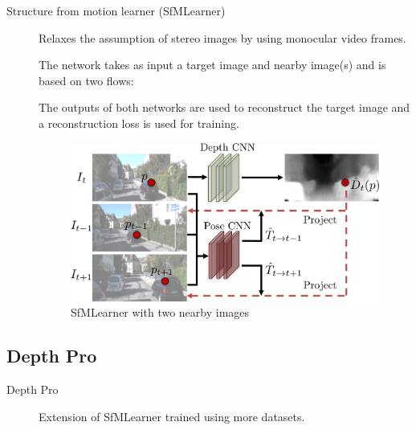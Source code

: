 \begin{description}
    \item[Structure from motion learner (SfMLearner)] 
        Relaxes the assumption of stereo images by using monocular video frames.

        The network takes as input a target image and nearby image(s) and is based on two flows:
        The outputs of both networks are used to reconstruct the target image and a reconstruction loss is used for training.

        \begin{figure}[H]
            \centering
            \includegraphics[width=0.5\linewidth]{./img/_sfmlearner.jpg}
            \caption{SfMLearner with two nearby images}
        \end{figure}
\end{description}


\subsection{Depth Pro}

\begin{description}
    \item[Depth Pro] 
        Extension of SfMLearner trained using more datasets.
\end{description}